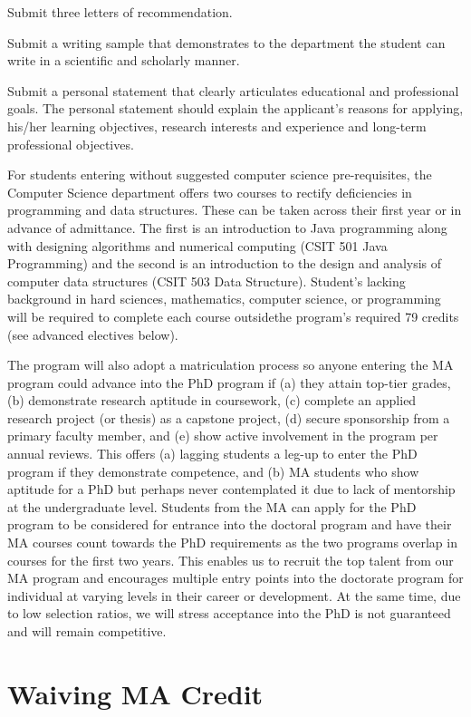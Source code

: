 \documentclass[
]{book}
\begin{document}
Submit three letters of recommendation.

Submit a writing sample that demonstrates to the department the student can write in a scientific and scholarly manner.

Submit a personal statement that clearly articulates educational and professional goals. The personal statement should explain the applicant's reasons for applying, his/her learning objectives, research interests and experience and long-term professional objectives.

For students entering without suggested computer science pre-requisites, the Computer Science department offers two courses to rectify deficiencies in programming and data structures. These can be taken across their first year or in advance of admittance. The first is an introduction to Java programming along with designing algorithms and numerical computing (CSIT 501 Java Programming) and the second is an introduction to the design and analysis of computer data structures (CSIT 503 Data Structure). Student's lacking background in hard sciences, mathematics, computer science, or programming will be required to complete each course outsidethe program's required 79 credits (see advanced electives below).

The program will also adopt a matriculation process so anyone entering the MA program could advance into the PhD program if (a) they attain top-tier grades, (b) demonstrate research aptitude in coursework, (c) complete an applied research project (or thesis) as a capstone project, (d) secure sponsorship from a primary faculty member, and (e) show active involvement in the program per annual reviews. This offers (a) lagging students a leg-up to enter the PhD program if they demonstrate competence, and (b) MA students who show aptitude for a PhD but perhaps never contemplated it due to lack of mentorship at the undergraduate level. Students from the MA can apply for the PhD program to be considered for entrance into the doctoral program and have their MA courses count towards the PhD requirements as the two programs overlap in courses for the first two years. This enables us to recruit the top talent from our MA program and encourages multiple entry points into the doctorate program for individual at varying levels in their career or development. At the same time, due to low selection ratios, we will stress acceptance into the PhD is not guaranteed and will remain competitive.

\hypertarget{waiving-ma-credit}{%
\section{Waiving MA Credit}\label{waiving-ma-credit}}
\end{document}
